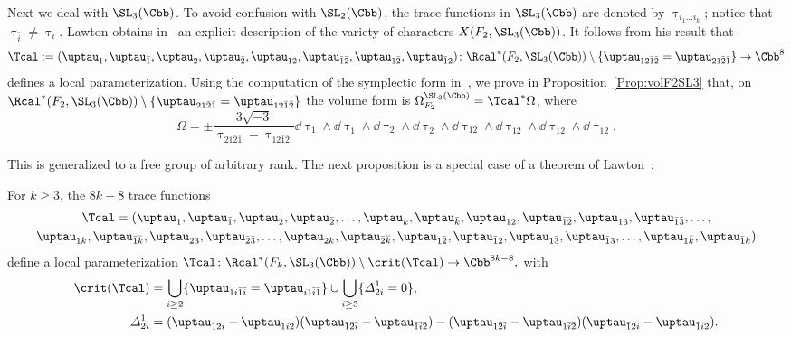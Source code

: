 Next we deal with $\SL_3(\Cbb)$. To avoid confusion with $\SL_2(\Cbb)$, the trace functions in $\SL_3(\Cbb)$ are denoted by $\uptau_{i_1\dots i_k}$; notice that $\uptau_{\bar i}\neq \uptau_i$. Lawton obtains in~\cite{LawtonJA} an explicit description of the variety of characters $X(F_2,\SL_3(\Cbb))$. It follows from his result that
\[
\Tcal := (\uptau_1, \uptau_{\bar 1},\uptau_2, \uptau_{\bar 2},\uptau_{12}, \uptau_{\bar 1\bar 2}, \uptau_{1\bar 2}, \uptau_{\bar 1 2})\colon
\Rcal^*(F_2,\SL_3(\Cbb)) \setminus \{ \uptau_{12\bar 1\bar 2}= \uptau_{21\bar 2\bar 1} \}\to \Cbb^8
\]
defines a local parameterization. Using the computation of the symplectic form in~\cite{LawtonP}, we prove in Proposition~\ref{Prop:volF2SL3} that, on $\Rcal^*(F_2,\SL_3(\Cbb)) \setminus \{ \uptau_{21\bar2\bar1}= \uptau_{12\bar1\bar2}\}$ the volume form is $\Omega_{F_2}^{\SL_3(\Cbb)}=\Tcal^*\Omega$, where
\[
\Omega=\pm \frac{3\sqrt{-3}}{ \uptau_{21\bar2\bar1}-\uptau_{12\bar1\bar2}} \dd \uptau_1\wedge \dd \uptau_{\bar 1} \wedge \dd \uptau_2\wedge \dd \uptau_{\bar 2}
\wedge \dd \uptau_{12}\wedge \dd \uptau_{\bar 1\bar 2}\wedge \dd \uptau_{1\bar 2}\wedge \dd \uptau_{\bar 1 2}.
\]

This is generalized to a free group of arbitrary rank. The next proposition is a special case of a theorem of Lawton~\cite[Theorem~6]{LawtonAI}:

\begin{prop}\label{prop:FkSL3}
For $k\geq 3 $, the $8k-8$ trace functions
\begin{multline*}
\Tcal= (\uptau_1, \uptau_{\bar 1},\uptau_2, \uptau_{\bar 2},\dots, \uptau_k, \uptau_{\bar k}, \uptau_{12}, \uptau_{\bar 1\bar 2}, \uptau_{13}, \uptau_{\bar 1\bar 3},\dots,\\
\uptau_{1k}, \uptau_{\bar 1\bar k},
\uptau_{23}, \uptau_{\bar 2\bar 3},\dots, \uptau_{2k}, \uptau_{\bar 2\bar k},
\uptau_{1\bar 2}, \uptau_{\bar 1 2}, \uptau_{1\bar 3}, \uptau_{\bar 1 3}, \dots, \uptau_{1\bar k}, \uptau_{\bar 1 k})
\end{multline*}
define a local parameterization $
\Tcal\colon \Rcal^*(F_k,\SL_3(\Cbb)) \setminus \crit(\Tcal)
\to \Cbb^{8k-8}, $ with
\begin{align*}
\crit(\Tcal)&=\bigcup_{i\geq 2} \{ \uptau_{1i\bar 1\bar i}= \uptau_{i1\bar i\bar 1} \} \cup \bigcup_{i\geq 3}\{ \varDelta^1_{2i} =0\}, \\
\varDelta^1_{2i} &= (\uptau_{12i}-\uptau_{1i2}) (\uptau_{\bar 1\bar 2\bar i}-\uptau_{\bar 1\bar i\bar 2}) - (\uptau_{1\bar 2\bar i}-\uptau_{1\bar i\bar 2}) (\uptau_{\bar 1 2 i}-\uptau_{\bar 1 i 2 }).
\end{align*}
\end{prop}

